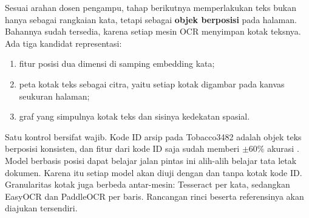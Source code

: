 Sesuai arahan dosen pengampu, tahap berikutnya memperlakukan teks bukan hanya sebagai
rangkaian kata, tetapi sebagai \textbf{objek berposisi} pada halaman. Bahannya sudah
tersedia, karena setiap mesin OCR menyimpan kotak teksnya. Ada tiga kandidat
representasi:
\begin{enumerate}
  \item fitur posisi dua dimensi di samping embedding kata;
  \item peta kotak teks sebagai citra, yaitu setiap kotak digambar pada kanvas seukuran
  halaman;
  \item graf yang simpulnya kotak teks dan sisinya kedekatan spasial.
\end{enumerate}

Satu kontrol bersifat wajib. Kode ID arsip pada Tobacco3482 adalah objek teks berposisi
konsisten, dan fitur dari kode ID saja sudah memberi $\pm$60\% akurasi
\parencite{larson2025}. Model berbasis posisi dapat belajar jalan pintas ini alih-alih
belajar tata letak dokumen. Karena itu setiap model akan diuji dengan dan tanpa kotak
kode ID. Granularitas kotak juga berbeda antar-mesin: Tesseract per kata, sedangkan
EasyOCR dan PaddleOCR per baris. Rancangan rinci beserta referensinya akan diajukan
tersendiri.
